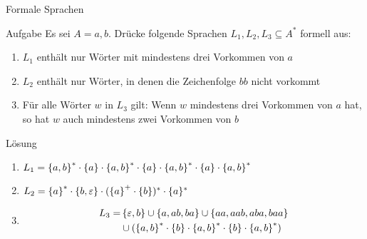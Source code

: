 \begin{frame}{Formale Sprachen}
	\begin{exampleblock}{Aufgabe}
		Es sei $A = {a,b}$. Drücke folgende Sprachen $L_1, L_2, L_3 \subseteq A^*$ formell aus:
		\begin{enumerate}
			\item $L_1$ enthält nur Wörter mit mindestens drei Vorkommen von $a$
			\item $L_2$ enthält nur Wörter, in denen die Zeichenfolge $bb$ nicht vorkommt
			\item Für alle Wörter $w$ in $L_3$ gilt: Wenn $w$ mindestens drei Vorkommen von $a$ hat, so hat $w$ auch mindestens zwei Vorkommen von $b$ 
		\end{enumerate}
	\end{exampleblock}
	\pause
	\begin{block}{Lösung}
		\begin{enumerate}
			\item $L_1 = \left\{ a,b \right\}^\ast \cdot \left\{ a \right\} \cdot \left\{ a,b \right\}^\ast \cdot \left\{ a \right\} \cdot \left\{ a,b \right\}^\ast \cdot \left\{ a \right\} \cdot \left\{ a,b \right\}^\ast$
			\item $L_2 = \left\{ a \right\}^\ast \cdot \left\{ b, \varepsilon \right\} \cdot (\left\{ a \right\}^+ \cdot \left\{ b \right\})^\ast \cdot \{ a \}^*$ 
			\item \begin{align*}L_3 = & \left\{ \varepsilon,b \right\} \cup \left\{ a, ab, ba \right\} \cup \left\{ aa, aab, aba, baa \right\} \\ & \cup (\left\{ a,b \right\}^\ast \cdot \left\{ b \right\} \cdot \left\{ a,b \right\}^\ast \cdot \left\{ b \right\} \cdot \left\{ a,b \right\}^\ast) \end{align*}
		\end{enumerate}
	\end{block}
\end{frame}